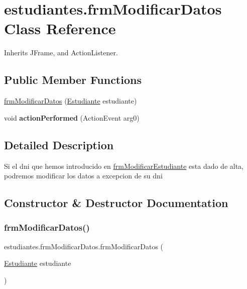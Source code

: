 \hypertarget{classestudiantes_1_1frm_modificar_datos}{}\section{estudiantes.\+frm\+Modificar\+Datos Class Reference}
\label{classestudiantes_1_1frm_modificar_datos}


Inherits J\+Frame, and Action\+Listener.

\subsection*{Public Member Functions}
\begin{DoxyCompactItemize}
\item 
\hyperlink{classestudiantes_1_1frm_modificar_datos_a66639a85e1051587f47369f5ba67faa3}{frm\+Modificar\+Datos} (\hyperlink{classestudiantes_1_1_estudiante}{Estudiante} estudiante)
\item 
\mbox{\label{classestudiantes_1_1frm_modificar_datos_a9dc542012cc6cd278f01e33ea0b25148}} 
void {\bfseries action\+Performed} (Action\+Event arg0)
\end{DoxyCompactItemize}


\subsection{Detailed Description}
Si el dni que hemos introducido en \hyperlink{classestudiantes_1_1frm_modificar_estudiante}{frm\+Modificar\+Estudiante} esta dado de alta, podremos modificar los datos a excepcion de su dni 

\subsection{Constructor \& Destructor Documentation}
\mbox{\label{classestudiantes_1_1frm_modificar_datos_a66639a85e1051587f47369f5ba67faa3}} 
\subsubsection{\texorpdfstring{frm\+Modificar\+Datos()}{frmModificarDatos()}}
{\footnotesize\ttfamily estudiantes.\+frm\+Modificar\+Datos.\+frm\+Modificar\+Datos (\begin{DoxyParamCaption}\item[{\hyperlink{classestudiantes_1_1_estudiante}{Estudiante}}]{estudiante }\end{DoxyParamCaption})}

